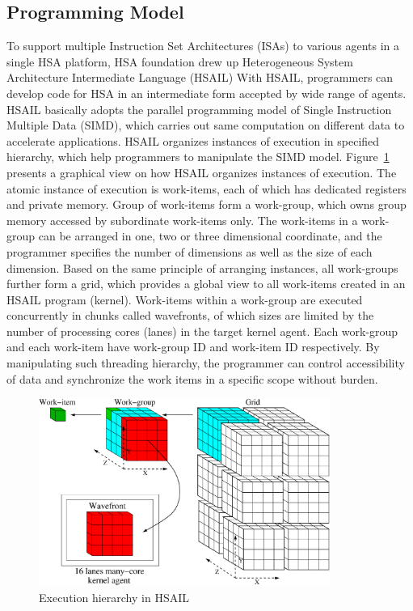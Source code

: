         \subsection{Programming Model}
        To support multiple Instruction Set Architectures (ISAs) to various agents in a single HSA platform,
        HSA foundation drew up Heterogeneous System Architecture Intermediate Language (HSAIL)
        With HSAIL, programmers can develop code for HSA in an intermediate form accepted by wide range of agents.
        HSAIL basically adopts the parallel programming model of Single Instruction Multiple Data (SIMD), 
        which carries out same computation on different data to accelerate applications.
        HSAIL organizes instances of execution in specified hierarchy, which help programmers to manipulate the SIMD model.
        Figure~\ref{fig:grid} presents a graphical view on how HSAIL organizes instances of execution.
        The atomic instance of execution is work-items, each of which has dedicated registers and private memory.
        Group of work-items form a work-group, which owns group memory accessed by subordinate work-items only.
        The work-items in a work-group can be arranged in one, two or three dimensional coordinate, 
        and the programmer specifies the number of dimensions as well as the size of each dimension.
        Based on the same principle of arranging instances, all work-groups further form a grid, 
        which provides a global view to all work-items created in an HSAIL program (kernel).
        Work-items within a work-group are executed concurrently in chunks called wavefronts, 
        of which sizes are limited by the number of processing cores (lanes) in the target kernel agent.
        Each work-group and each work-item have work-group ID and work-item ID respectively.
        By manipulating such threading hierarchy, 
        the programmer can control accessibility of data and synchronize the work items in a specific scope without burden.
        \vspace{\textfig}
        \begin{figure}[!ht] 
            \centering
            \includegraphics[width=0.85\textwidth]{./figs/grid.eps}
            \caption{Execution hierarchy in HSAIL}
            \label{fig:grid}
        \end{figure}
